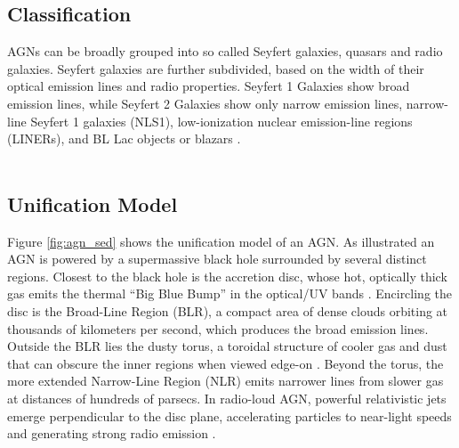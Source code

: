 \subsection{Classification}
\label{sec:classification}

AGNs can be broadly grouped into so called Seyfert galaxies, quasars and radio galaxies. Seyfert galaxies are further subdivided, based on the width of their optical emission lines and radio properties. Seyfert 1 Galaxies show broad emission lines, while Seyfert 2 Galaxies show only narrow emission lines, narrow-line Seyfert 1 galaxies (NLS1), low-ionization nuclear emission-line regions (LINERs), and BL Lac objects or blazars \parencite{antonucci1993unified,urry1995unified}.\\\\


\subsection{Unification Model}
\label{sec:unification_model}
Figure \ref{fig:agn_sed} shows the unification model of an AGN. 
As illustrated an AGN is powered by a supermassive black hole surrounded by several distinct regions. Closest to the black hole is the accretion disc, whose hot, optically thick gas emits the thermal “Big Blue Bump” in the optical/UV bands \parencite{peterson1997introduction}. Encircling the disc is the Broad-Line Region (BLR), a compact area of dense clouds orbiting at thousands of kilometers per second, which produces the broad emission lines. Outside the BLR lies the dusty torus, a toroidal structure of cooler gas and dust that can obscure the inner regions when viewed edge-on \parencite{antonucci1993unified}. Beyond the torus, the more extended Narrow-Line Region (NLR) emits narrower lines from slower gas at distances of hundreds of parsecs. In radio-loud AGN, powerful relativistic jets emerge perpendicular to the disc plane, accelerating particles to near-light speeds and generating strong radio emission \parencite{urry1995unified}.


